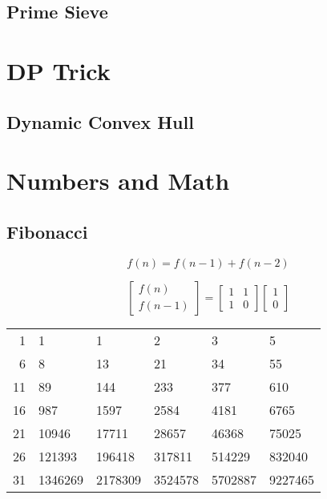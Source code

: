 \documentclass[twocolumn]{article}
\begin{document}
\subsection{Prime Sieve}


\section{DP Trick}

\subsection{Dynamic Convex Hull}


\section{Numbers and Math}

\subsection{Fibonacci}

$$f(n)=f(n-1)+f(n-2)$$

\begin{equation*}
    \begin{bmatrix}
        f(n) \\
        f(n - 1)
    \end{bmatrix}
    =
    \begin{bmatrix}
        1 & 1 \\
        1 & 0
    \end{bmatrix}
    \begin{bmatrix}
        1 \\
        0
    \end{bmatrix}
\end{equation*}

\begin{tabular}{r|lllll}
    1 & 1 & 1 & 2 & 3 & 5 \\
    6 & 8 & 13 & 21 & 34 & 55\\
    11 & 89 & 144 & 233 & 377 & 610 \\
    16 & 987 & 1597 & 2584 & 4181 & 6765\\
    21 & 10946 & 17711 & 28657 & 46368 & 75025 \\
    26 & 121393 & 196418 & 317811 & 514229 & 832040 \\
    31 & 1346269 & 2178309 & 3524578 & 5702887 & 9227465 \\
\end{tabular}
\end{document}
